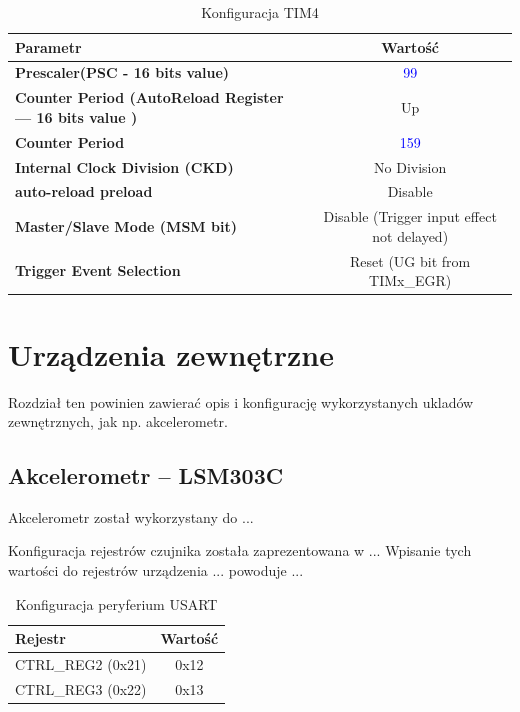 \documentclass[10pt, a4paper]{article}
\begin{document}
\begin{table}[H]
	\centering
	\begin{tabular}{|l|c|} \hline
		\textbf{Parametr} & Wartość \\
		\hline
		\hline  \textbf{Prescaler(PSC - 16 bits value) }& \textcolor{blue}{99} \\ 
		\hline  \textbf{Counter Period (AutoReload Register --- 16 bits value )} & Up \\
		\hline  \textbf{Counter Period} & \textcolor{blue}{159} \\
		\hline  \textbf{Internal Clock Division (CKD) } & No Division\\
		\hline  \textbf{auto-reload preload} & Disable\\
		\hline  \textbf{Master/Slave Mode (MSM bit) } & Disable (Trigger input effect not delayed)
		\\
	\hline  \textbf{Trigger Event Selection} & Reset (UG bit from TIMx\_EGR)  \\
	\hline

	\end{tabular}
	\caption{Konfiguracja TIM4}
	\label{tab:TIM4}
\end{table}


\section{Urządzenia zewnętrzne}

Rozdział ten powinien zawierać opis i konfigurację wykorzystanych ukladów
zewnętrznych, jak np. akcelerometr.

\subsection{Akcelerometr -- LSM303C}

Akcelerometr został wykorzystany do ...

Konfiguracja rejestrów czujnika została zaprezentowana w ...
Wpisanie tych wartości do rejestrów urządzenia ... powoduje ...

\begin{table}[H]
	\centering
	\begin{tabular}{|l|c|} \hline
		\textbf{Rejestr} & Wartość \\
		\hline
		\hline
		CTRL\_REG2 (0x21) & 0x12\\\hline
		CTRL\_REG3 (0x22) & 0x13\\\hline
	\end{tabular}
	\caption{Konfiguracja peryferium USART}
	\label{tab:Akcelerometr}
\end{table}
\end{document}
